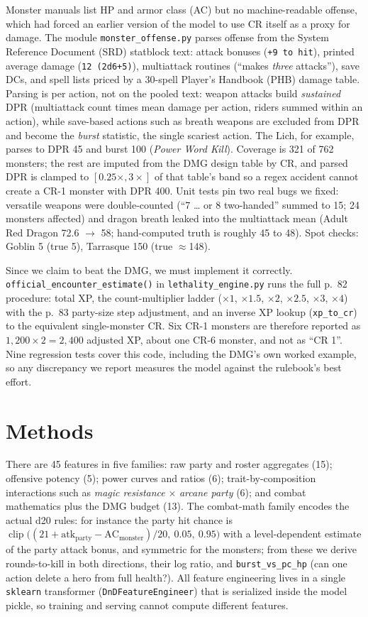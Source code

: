 \documentclass[10pt]{article}
\newcommand{\code}[1]{\texttt{\small #1}}
\begin{document}
Monster manuals list HP and armor class (AC) but no machine-readable offense, which had forced an
earlier version of the model to use CR itself as a proxy for damage. The module
\code{monster\_offense.py} parses offense from the System Reference Document (SRD) statblock text: attack
bonuses (\code{+9 to hit}), printed average damage (\code{12 (2d6+5)}), multiattack
routines (``makes \emph{three} attacks''), save DCs, and spell lists priced by a
30-spell Player's Handbook (PHB) damage table. Parsing is per action, not on the pooled text: weapon
attacks build \emph{sustained} DPR (multiattack count times mean damage per action,
riders summed within an action), while save-based actions such as breath weapons are
excluded from DPR and become the \emph{burst} statistic, the single scariest action.
The Lich, for example, parses to DPR 45 and burst 100 (\emph{Power Word Kill}).
Coverage is 321 of 762 monsters; the rest are imputed from the DMG design table by
CR, and parsed DPR is clamped to $[0.25\times,3\times]$ of that table's band so a
regex accident cannot create a CR-1 monster with DPR 400. Unit tests pin two real
bugs we fixed: versatile weapons were double-counted (``7 \ldots{} or 8 two-handed''
summed to 15; 24 monsters affected) and dragon breath leaked into the multiattack
mean (Adult Red Dragon 72.6 $\to$ 58; hand-computed truth is roughly 45 to 48).
Spot checks: Goblin 5 (true 5), Tarrasque 150 (true $\approx$148).

Since we claim to beat the DMG, we must implement it correctly.
\code{official\_encounter\_estimate()} in \code{lethality\_engine.py} runs the full
p.~82 procedure: total XP, the count-multiplier ladder ($\times1$, $\times1.5$,
$\times2$, $\times2.5$, $\times3$, $\times4$) with the p.~83 party-size step
adjustment, and an inverse XP lookup (\code{xp\_to\_cr}) to the equivalent
single-monster CR. Six CR-1 monsters are therefore reported as $1{,}200 \times 2 =
2{,}400$ adjusted XP, about one CR-6 monster, and not as ``CR 1''. Nine regression
tests cover this code, including the DMG's own worked example, so any discrepancy
we report measures the model against the rulebook's best effort.

\section{Methods}
There are 45 features in five families: raw party and roster aggregates (15);
offensive potency (5); power curves and ratios (6); trait-by-composition
interactions such as \emph{magic resistance} $\times$ \emph{arcane party} (6); and
combat mathematics plus the DMG budget (13). The combat-math family encodes the
actual d20 rules: for instance the party hit chance is
$\operatorname{clip}\!\big((21 + \text{atk}_\text{party} -
\text{AC}_\text{monster})/20,\ 0.05,\ 0.95\big)$ with a level-dependent estimate of
the party attack bonus, and symmetric for the monsters; from these we derive
rounds-to-kill in both directions, their log ratio, and \code{burst\_vs\_pc\_hp}
(can one action delete a hero from full health?). All feature engineering lives in
a single \code{sklearn} transformer (\code{DnDFeatureEngineer}) that is serialized
inside the model pickle, so training and serving cannot compute different features.
\end{document}
